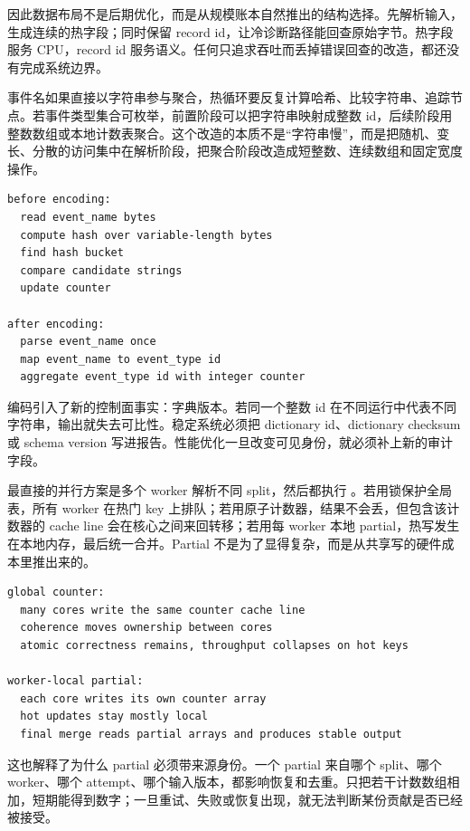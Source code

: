 因此数据布局不是后期优化，而是从规模账本自然推出的结构选择。先解析输入，生成连续的热字段；同时保留 record id，让冷诊断路径能回查原始字节。热字段服务 CPU，record id 服务语义。任何只追求吞吐而丢掉错误回查的改造，都还没有完成系统边界。

事件名如果直接以字符串参与聚合，热循环要反复计算哈希、比较字符串、追踪节点。若事件类型集合可枚举，前置阶段可以把字符串映射成整数 id，后续阶段用整数数组或本地计数表聚合。这个改造的本质不是“字符串慢”，而是把随机、变长、分散的访问集中在解析阶段，把聚合阶段改造成短整数、连续数组和固定宽度操作。

\begin{lstlisting}[numbers=none,caption={字典编码前后的热路径账本}]
before encoding:
  read event_name bytes
  compute hash over variable-length bytes
  find hash bucket
  compare candidate strings
  update counter

after encoding:
  parse event_name once
  map event_name to event_type id
  aggregate event_type id with integer counter
\end{lstlisting}

编码引入了新的控制面事实：字典版本。若同一个整数 id 在不同运行中代表不同字符串，输出就失去可比性。稳定系统必须把 dictionary id、dictionary checksum 或 schema version 写进报告。性能优化一旦改变可见身份，就必须补上新的审计字段。

最直接的并行方案是多个 worker 解析不同 split，然后都执行 。若用锁保护全局表，所有 worker 在热门 key 上排队；若用原子计数器，结果不会丢，但包含该计数器的 cache line 会在核心之间来回转移；若用每 worker 本地 partial，热写发生在本地内存，最后统一合并。Partial 不是为了显得复杂，而是从共享写的硬件成本里推出来的。

\begin{lstlisting}[numbers=none,caption={共享计数到 partial 的推导}]
global counter:
  many cores write the same counter cache line
  coherence moves ownership between cores
  atomic correctness remains, throughput collapses on hot keys

worker-local partial:
  each core writes its own counter array
  hot updates stay mostly local
  final merge reads partial arrays and produces stable output
\end{lstlisting}

这也解释了为什么 partial 必须带来源身份。一个 partial 来自哪个 split、哪个 worker、哪个 attempt、哪个输入版本，都影响恢复和去重。只把若干计数数组相加，短期能得到数字；一旦重试、失败或恢复出现，就无法判断某份贡献是否已经被接受。

